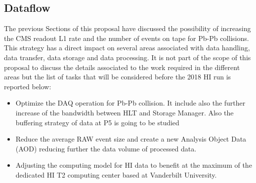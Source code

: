 \subsection{Dataflow\label{subsec:dataflow}}
The previous Sections of this proposal have discussed the possibility of increasing the CMS readout L1 rate and the number of events on tape for Pb-Pb collisions. This strategy has a direct impact on several areas associated with data handling, data transfer, data storage and data processing. It is not part of the scope of this proposal to discuss the details associated to the work required in the different areas but the list of tasks that will be considered before the 2018 HI run is reported below:

\begin{itemize}
\item Optimize the DAQ operation for Pb-Pb collision. It include also the further increase of the bandwidth between HLT and Storage Manager. Also the buffering strategy of data at P5 is going to be studied

\item Reduce the average RAW event size and create a new Analysis Object Data (AOD) reducing further the data volume of processed data.

\item Adjusting the computing model for HI data to benefit at the maximum of the dedicated HI T2 computing center based at Vanderbilt University. 
\end{itemize}


